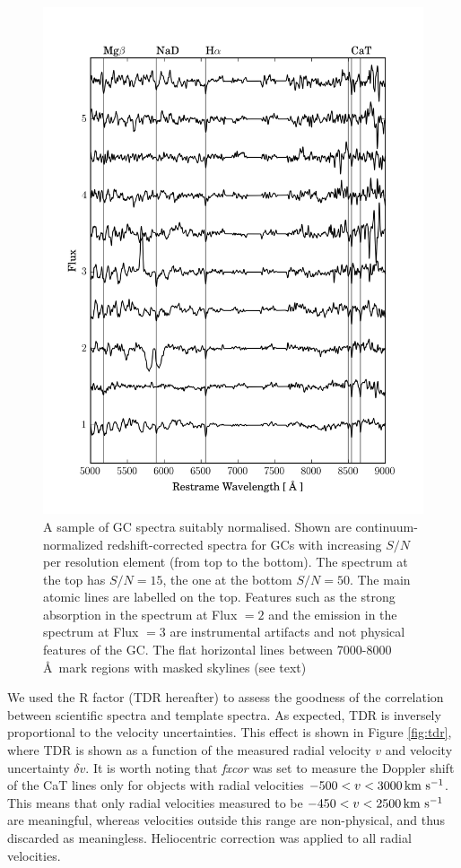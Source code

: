 \documentclass[useAMS,usenatbib]{mn2e}
\newcommand{\kms}{\mbox{\,km~s$^{-1}$}}
\begin{document}
\begin{figure}
\centering
\includegraphics[width=\columnwidth]{figures/vstack_spectra.png} 
\caption{A sample of GC spectra suitably normalised. Shown are 
continuum-normalized redshift-corrected spectra for GCs with increasing $S/N$ per resolution element
(from top to the bottom). The spectrum at the top has $S/N = 15$, 
the one at the bottom $S/N = 50$. The main atomic lines are labelled on the top. Features 
such as the strong absorption in the spectrum at Flux $= 2$ and the emission in 
the spectrum at Flux $=3$ are instrumental artifacts and not physical features 
of the GC. The flat horizontal lines between 7000-8000 \AA\ mark regions with 
masked skylines (see text)}
\label{fig:spectra}
\end{figure}

We used the \citet{Tonry79} R factor (TDR hereafter) to assess the goodness of 
the correlation between scientific spectra and template spectra. As expected, 
TDR is inversely proportional to the velocity uncertainties. This effect is 
shown in Figure \ref{fig:tdr}, where TDR is shown as a function of the measured 
radial velocity $v$ and velocity uncertainty $\delta v$. 
It is worth noting that {\it fxcor} was set to measure the Doppler shift of the 
CaT lines only for objects with radial velocities $-500 < v < 3000 \kms$. This 
means that only radial velocities measured to be $-450 < v < 2500 \kms$ are 
meaningful, whereas velocities outside this range are non-physical, and thus 
discarded as meaningless. Heliocentric correction was applied to all radial 
velocities. 
\end{document}
